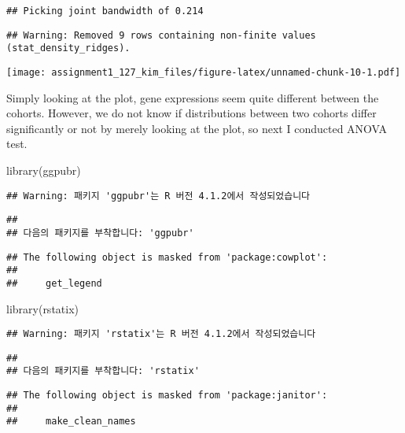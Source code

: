 \documentclass[
]{article}
\newenvironment{Shaded}{\begin{snugshade}}{\end{snugshade}}
\newcommand{\FunctionTok}[1]{\textcolor[rgb]{0.00,0.00,0.00}{#1}}
\newcommand{\NormalTok}[1]{#1}
\begin{document}
\begin{verbatim}
## Picking joint bandwidth of 0.214
\end{verbatim}

\begin{verbatim}
## Warning: Removed 9 rows containing non-finite values (stat_density_ridges).
\end{verbatim}

\texttt{[image: assignment1\_127\_kim\_files/figure-latex/unnamed-chunk-10-1.pdf]}

Simply looking at the plot, gene expressions seem quite different
between the cohorts. However, we do not know if distributions between
two cohorts differ significantly or not by merely looking at the plot,
so next I conducted ANOVA test.

\begin{Shaded}
\begin{Highlighting}[]
\FunctionTok{library}\NormalTok{(ggpubr)}
\end{Highlighting}
\end{Shaded}

\begin{verbatim}
## Warning: 패키지 'ggpubr'는 R 버전 4.1.2에서 작성되었습니다
\end{verbatim}

\begin{verbatim}
## 
## 다음의 패키지를 부착합니다: 'ggpubr'
\end{verbatim}

\begin{verbatim}
## The following object is masked from 'package:cowplot':
## 
##     get_legend
\end{verbatim}

\begin{Shaded}
\begin{Highlighting}[]
\FunctionTok{library}\NormalTok{(rstatix)}
\end{Highlighting}
\end{Shaded}

\begin{verbatim}
## Warning: 패키지 'rstatix'는 R 버전 4.1.2에서 작성되었습니다
\end{verbatim}

\begin{verbatim}
## 
## 다음의 패키지를 부착합니다: 'rstatix'
\end{verbatim}

\begin{verbatim}
## The following object is masked from 'package:janitor':
## 
##     make_clean_names
\end{verbatim}
\end{document}
